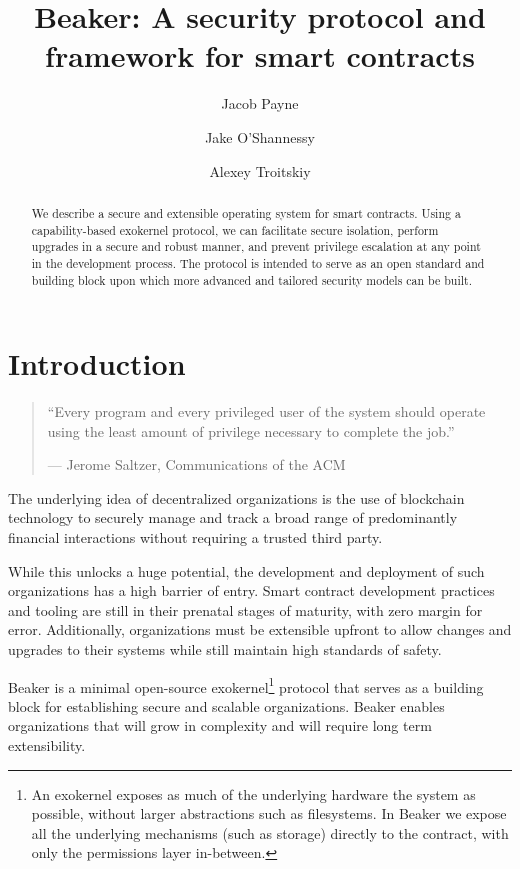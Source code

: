 \documentclass[english,a4paper]{article}
\title{Beaker: A security protocol and framework for smart
contracts}\label{beaker-a-security-protocol-and-framework-for-smart-contracts}
\author{Jacob Payne \and Jake O'Shannessy \and Alexey Troitskiy}
\begin{document}
\maketitle

\begin{abstract}\label{abstract}

We describe a secure and extensible operating system for smart contracts. Using
a capability-based exokernel protocol, we can facilitate secure isolation,
perform upgrades in a secure and robust manner, and prevent privilege escalation 
at any point in the development process. The protocol is intended to serve as an open
standard and building block upon which more advanced and tailored security
models can be built.

\end{abstract}

\newpage
\tableofcontents
\newpage

\section{Introduction}\label{introduction}
\begin{quote}
``Every program and every privileged user of the system should operate
using the least amount of privilege necessary to complete the job.''

--- Jerome Saltzer, Communications of the ACM
\end{quote}

The underlying idea of decentralized organizations is the use of
blockchain technology to securely manage and track a broad range of
predominantly financial interactions without requiring a trusted third
party.

While this unlocks a huge potential, the development and deployment of such
organizations
has a high barrier of entry. Smart contract development practices and
tooling are still in their prenatal stages of maturity, with zero margin
for error. Additionally, organizations must be extensible upfront to
allow changes and upgrades to their systems while still maintain high
standards of safety.

Beaker is a minimal open-source exokernel\footnote{An exokernel exposes as much
of the underlying hardware the system as possible, without larger abstractions
such as filesystems. In Beaker we expose all the underlying mechanisms (such as
storage) directly to the contract, with only the permissions layer in-between.}
protocol that serves as a building block for establishing secure and scalable
organizations. Beaker enables organizations that will grow in complexity and
will require long term extensibility.
\end{document}
